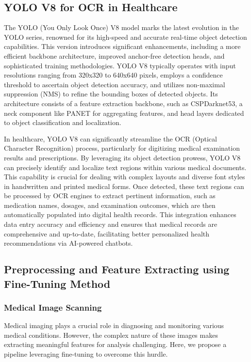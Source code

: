 \documentclass[conference]{IEEEtran}
\begin{document}
    \subsection{YOLO V8 for OCR in Healthcare}
    The YOLO (You Only Look Once) V8 model marks the latest evolution in the YOLO \cite{jiang2022review} series, renowned for its high-speed and accurate real-time object detection capabilities. This version introduces significant enhancements, including a more efficient backbone architecture, improved anchor-free detection heads, and sophisticated training methodologies. YOLO V8 typically operates with input resolutions ranging from 320x320 to 640x640 pixels, employs a confidence threshold to ascertain object detection accuracy, and utilizes non-maximal suppression (NMS) to refine the bounding boxes of detected objects. Its architecture consists of a feature extraction backbone, such as CSPDarknet53, a neck component like PANET for aggregating features, and head layers dedicated to object classification and localization.
    
    In healthcare, YOLO V8 can significantly streamline the OCR (Optical Character Recognition) process, particularly for digitizing medical examination results and prescriptions. By leveraging its object detection prowess, YOLO V8 can precisely identify and localize text regions within various medical documents. This capability is crucial for dealing with complex layouts and diverse font styles in handwritten and printed medical forms. Once detected, these text regions can be processed by OCR engines to extract pertinent information, such as medication names, dosages, and examination outcomes, which are then automatically populated into digital health records. This integration enhances data entry accuracy and efficiency and ensures that medical records are comprehensive and up-to-date, facilitating better personalized health recommendations via AI-powered chatbots.

    \subsection{Preprocessing and Feature Extracting using Fine-Tuning Method}
        \subsubsection{Medical Image Scanning}
        Medical imaging plays a crucial role in diagnosing and monitoring various medical conditions. However, the complex nature of these images makes extracting meaningful features for analysis challenging. Here, we propose a pipeline leveraging fine-tuning to overcome this hurdle.
        
\end{document}
